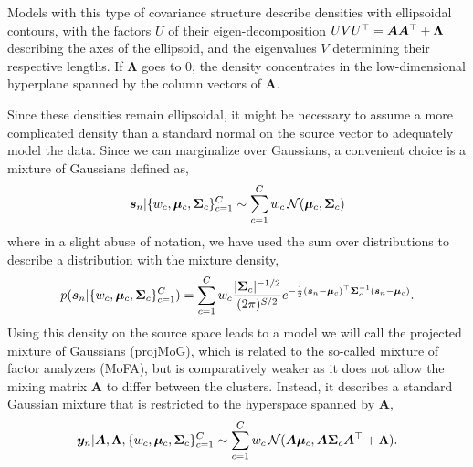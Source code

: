 \documentclass{article}
\newcommand{\mix}{\bm{A}}
\newcommand{\source}{s}
\newcommand{\sourcevec}{\bm{\source}}
\newcommand{\obs}{y}
\newcommand{\obsvec}{\bm{\obs}}
\newcommand{\noisecov}{\bm{\Lambda}}
\newcommand{\mean}{\mu}
\newcommand{\meanvec}{\bm{\mean}}
\newcommand{\weight}{w}
\newcommand{\compweight}{{\weight}}
\newcommand{\compmeanvec}{{\meanvec}}
\newcommand{\compcov}{{\bm{\Sigma}}}
\newcommand{\numfactor}{S}
\newcommand{\numcluster}{C}
\newcommand{\icluster}{c}
\begin{document}
Models with this type of covariance structure describe densities with ellipsoidal contours, with the factors $U$ of their eigen-decomposition $UVU\T=\mix\mix\T+\noisecov$ describing the axes of the ellipsoid, and the eigenvalues $V$ determining their respective lengths. If $\noisecov$ goes to $0$, the density concentrates in the low-dimensional hyperplane spanned by the column vectors of $\mix$.

Since these densities remain ellipsoidal, it might be necessary to assume a more complicated density than a standard normal on the source vector to adequately model the data. Since we can marginalize over Gaussians, a convenient choice is a mixture of Gaussians defined as,
\begin{equation}
\label{eq:sourcemixture}
\sourcevec_n\cond \lbrace \compweight_\icluster,\compmeanvec_\icluster,\compcov_\icluster\rbrace_{\icluster=1}^{\numcluster}\sim \sum_{\icluster=1}^{\numcluster}\compweight_\icluster\gaussrnd(\compmeanvec_\icluster,\compcov_\icluster)
\end{equation}
where in a slight abuse of notation, we have used the sum over distributions to describe a distribution with the mixture density,
\begin{equation}
p(\sourcevec_n\cond \lbrace \compweight_\icluster,\compmeanvec_\icluster,\compcov_\icluster\rbrace_{\icluster=1}^{\numcluster})=\sum_{\icluster=1}^{\numcluster}\compweight_\icluster\frac{|\compcov_\icluster|^{-1/2}}{(2\pi)^{\numfactor/2}}e^{-\frac{1}{2}(\sourcevec_n-\compmeanvec_\icluster)\T\compcov_\icluster^{-1}(\sourcevec_n-\compmeanvec_\icluster)}. 
\end{equation}
Using this density on the source space leads to a model we will call the projected mixture of Gaussians (projMoG), which is related to the so-called mixture of factor analyzers (MoFA), but is comparatively weaker as it does not allow the mixing matrix $\mix$ to differ between the clusters. Instead, it describes a standard Gaussian mixture that is restricted to the hyperspace spanned by $\mix$,
\begin{equation}
\label{eq:obsmixture}
\obsvec_n\cond \mix,\noisecov,\lbrace \compweight_\icluster,\compmeanvec_\icluster,\compcov_\icluster\rbrace_{\icluster=1}^{\numcluster}\sim \sum_{\icluster=1}^{\numcluster}\compweight_\icluster\gaussrnd(\mix\compmeanvec_\icluster,\mix\compcov_\icluster\mix\T+\noisecov).
\end{equation}
\end{document}
